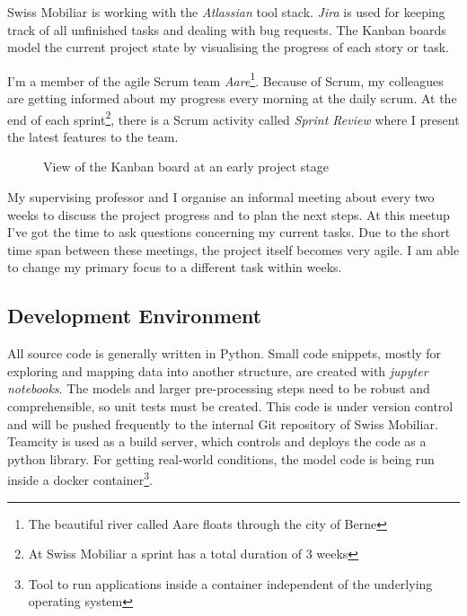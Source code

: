 Swiss Mobiliar is working with the \emph{Atlassian} tool stack. \emph{Jira} is used for keeping track of all unfinished tasks and
dealing with bug requests. The Kanban boards model the current project state by visualising the progress of each story or task.

I'm a member of the agile Scrum team \emph{Aare}\footnote{The beautiful river called Aare floats through the city of Berne}. Because of
Scrum, my colleagues are getting informed about my progress every morning at the daily scrum. At the end of each sprint\footnote{At
Swiss Mobiliar a sprint has a total duration of 3 weeks}, there is a Scrum activity called \emph{Sprint Review} where I present the
latest features to the team.

\begin{figure}[!ht]
\centering
{}
\caption{View of the Kanban board at an early project stage}
\label{fig:kanban}
\end{figure}

My supervising professor and I organise an informal meeting about every two weeks to discuss the project progress and to plan the
next steps. At this meetup I've got the time to ask questions concerning my current tasks. Due to the short time span between these
meetings, the project itself becomes very agile. I am able to change my primary focus to a different task within weeks.

\subsection{Development Environment}

All source code is generally written in Python. Small code snippets, mostly for exploring and mapping data into another structure,
are created with \emph{jupyter notebooks}. The models and larger pre-processing steps need to be robust and comprehensible, so
unit tests must be created. This code is under version control and will be pushed frequently to the internal Git repository of
Swiss Mobiliar. Teamcity is used as a build server, which controls and deploys the code as a python library. For getting real-world
conditions, the model code is being run inside a docker container\footnote{Tool to run applications inside a container independent
of the underlying operating system}.
